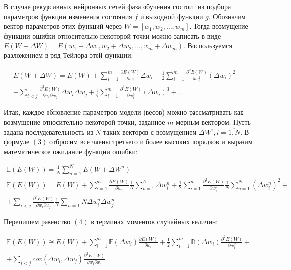 \documentclass[14pt]{article}
\begin{document}
В случае рекурсивных нейронных сетей фаза обучения состоит из подбора параметров функции изменения состояния $f$ и выходной функции $g$. Обозначим вектор параметров этих функций через $W = [w_1, w_2, \dots, w_m]$. Тогда возмущение функции ошибки относительно некоторой точки можно записать в виде\\ $E(W + \Delta W) = E(w_1 + \Delta w_1, w_2 + \Delta w_2, \dots, w_m + \Delta w_m)$. Воспользуемся разложением в ряд Тейлора этой функции:


\begin{multline}
\label{trivial}
E(W + \Delta W) = E(W) + \sum\limits_{i = 1}^m\frac{\partial E(W)}{\partial w_i}\Delta w_i +
\frac{1}{2}\sum\limits_{i = 1}^m\frac{\partial^2 E(W)}{\partial w_i^2}(\Delta w_i)^2 +\\
+\sum\limits_{i < j}\frac{\partial^2 E(W)}{\partial w_i \partial w_j}\Delta w_i \Delta w_j+
\frac{1}{6}\sum\limits_{i = 1}^m\frac{\partial^3 E(W)}{\partial w_i^3}(\Delta w_i)^3 + \dots
\end{multline}


Итак, каждое обновление параметров модели (весов) можно рассматривать как возмущение относительно некоторой точки, заданное $m$-мерным вектором. Пусть задана послудевательность из $N$ таких векторов с возмущением $\Delta W^i, i = \overline{1, N}$. В формуле $(3)$ отбросим все члены третьего и более высоких порядков и выразим математическое ожидание функции ошибки:


\begin{multline}
\label{trivial}
\mathbb{E}(E(W)) = \frac{1}{N}\sum\limits_{n = 1}^N E(W + \Delta W^n)\\
\mathbb{E}(E(W)) = E(W) + \sum\limits_{i = 1}^m\frac{\partial E(W)}{\partial w_i}\frac{1}{N}\sum\limits_{n=1}^N\Delta w_i^n+ \frac{1}{2}\sum\limits_{i=1}^m\frac{\partial^2E(W)}{\partial w_i^2}\frac{1}{N}\sum\limits_{n=1}^N(\Delta w_i^n)^2 
+\\+\sum\limits_{i<j}\frac{\partial^2E(W)}{\partial w_i\partial w_j}\frac{1}{N}\sum\limits_{n=1}{N}\Delta w_i^n\Delta w_j^n
\end{multline}


Перепишем равенство $(4)$ в терминах моментов случайных величин:


\begin{multline}
\mathbb{E}(E(W)) \cong E(W) + \sum\limits_{i=1}^m\mathbb{E}(\Delta w_i)\frac{\partial E(W)}{\partial w_i} +
\frac{1}{2}\sum\limits_{i=1}^{m}\mathbb{D}(\Delta w_i)\frac{\partial^2E(W)}{\partial w_i^2} +\\
+ \sum\limits_{i<j}cov(\Delta w_i, \Delta w_j)\frac{\partial^2E(W)}{\partial w_i \partial w_j}
\end{multline}
\end{document}
